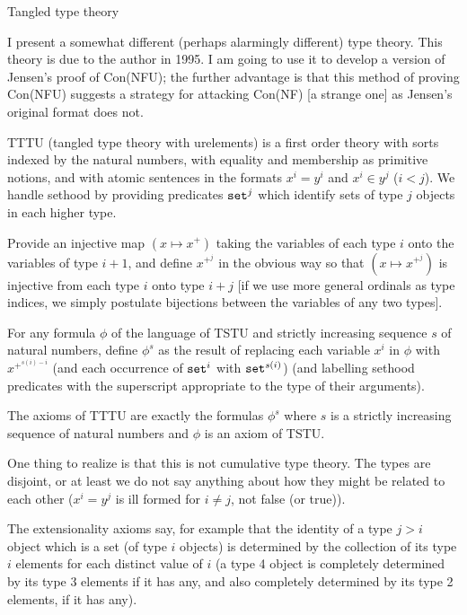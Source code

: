 \documentclass{slides}
\begin{document}
\begin{slide}

{\large Tangled type theory}

I present a somewhat different (perhaps alarmingly different) type theory.  This theory is due to the author in 1995.  I am going to use it to develop a version of Jensen's proof of Con(NFU);  the further advantage is that this method of proving Con(NFU) suggests a strategy for attacking Con(NF) [a strange one] as Jensen's original format does not.

TTTU (tangled type theory with urelements) is a first order theory with sorts indexed by the natural numbers, with equality and membership as primitive notions, and with atomic sentences in the formats $x^i=y^i$ and $x^i \in y^j$ ($i<j$).  We handle sethood by providing predicates ${\tt set}^j$ which identify sets of type $j$ objects in each higher type.

Provide an injective map $(x\mapsto x^+)$ taking the variables of each type $i$ onto the variables of type $i+1$,
and define $x^{+^j}$ in the obvious way so that $(x\mapsto x^{+^j})$ is injective from each type $i$ onto type $i+j$ [if we use more general ordinals as type indices, we simply postulate bijections between the variables of any two types].

For any formula $\phi$ of the language of TSTU and strictly increasing sequence $s$ of natural numbers, define $\phi^s$ as the result of replacing each variable $x^i$ in $\phi$ with $x^{+^{s(i)-i}}$ (and each occurrence of
${\tt set}^i$ with ${\tt set}^{s(i)}$) (and labelling sethood predicates with the superscript appropriate to the type of their arguments).

The axioms of TTTU are exactly the formulas $\phi^s$ where $s$ is a strictly increasing sequence of natural numbers and $\phi$ is an axiom of TSTU.

One thing to realize is that this is not cumulative type theory.  The types are disjoint, or at least we do not say anything about how they might be related to each other ($x^i = y^j$ is ill formed for $i \neq j$, not false (or true)).

The extensionality axioms say, for example that the identity of a type $j>i$ object which is a set (of type $i$ objects) is determined by the collection of its type $i$ elements for each distinct value of $i$  (a type 4 object is completely determined by its type 3 elements if it has any, and also completely determined by its type 2 elements, if it has any).

\end{slide}
\end{document}
